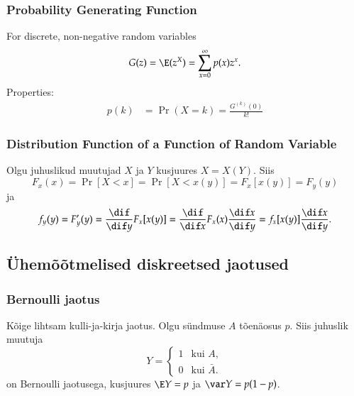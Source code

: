 \documentclass[a4paper]{article}
\numberwithin{equation}{subsection}
\begin{document}

\subsubsection{Probability Generating Function}
\label{sec:probability_generating_function}

For discrete, non-negative random variables
\begin{equation}
  G(z) = \E (z^X) = \sum_{x=0}^{\infty}p(x)z^x.
\end{equation}
Properties:
\begin{align}
  p(k) &= \operatorname{Pr}(X = k) = \frac{G^{(k)}(0)}{k!}
\end{align}

\subsubsection{Distribution Function of a Function of Random Variable}
Olgu juhuslikud muutujad $X$ ja $Y$ kusjuures $X=X(Y)$.  Siis
\begin{equation}
  F_x(x) = \Pr[X < x] = \Pr[X < x(y)] = F_x[x(y)] = F_y(y)
\end{equation}
ja
\begin{equation}
  f_y(y) = F_y'(y) = \frac{\dif}{\dif y} F_x[x(y)] =
  \frac{\dif}{\dif x} F_x(x) \frac{\dif x}{\dif y} = f_x[x(y)]
  \frac{\dif x}{\dif y}. 
\end{equation}


\subsection{Ühemõõtmelised diskreetsed jaotused}

\subsubsection{Bernoulli jaotus}
Kõige lihtsam kulli-ja-kirja jaotus.  Olgu sündmuse $A$ tõenäosus
$p$.  Siis juhuslik muutuja
\begin{equation}
  Y = 
  \begin{cases}
    1 & \text{kui $A$},\\
    0 & \text{kui $\bar A$.}
  \end{cases}
\end{equation}
on Bernoulli jaotusega, kusjuures $\E Y = p$ ja $\var Y = p(1-p)$.
\end{document}
